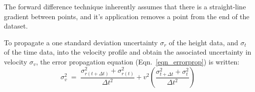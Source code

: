 \documentclass[namedreferences]{SolarPhysics}
\begin{document}
\begin{article}


The forward difference technique inherently assumes that there is a straight-line gradient between points, and it's application removes a point from the end of the dataset.

To propagate a one standard deviation uncertainty $\sigma_r$ of the height data, and $\sigma_t$ of the time data, into the velocity profile and obtain the associated uncertainty in velocity $\sigma_v$, the error propagation equation (Eqn.~\ref{eqn_errorprop}) is written:
\begin{equation}
\label{eqn_fwderrorprop}
\sigma_v^2 \; = \; \frac{\sigma_{r(t+\Delta t)}^2+\sigma_{r(t)}^2}{\Delta t^2} + v^2 \left( \frac{\sigma_{t+\Delta t}^2+\sigma_t^2}{\Delta t^2} \right) %
\end{equation}


\end{article}
\end{document}
